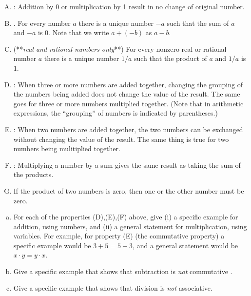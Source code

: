 \begin{enumerate}[(A)]
\item
{}:   Addition by 0 or multiplication by 1 result in no change of original number.
\item
{}. For every number $a$ there is a unique number $-a$ such that the sum of $a$ and $-a$ is 0.   Note that we write $a + (-b)$ as $a-b$.
\item
{} (**\emph{real and rational numbers only}**)   For every nonzero real or rational number $a$ there is a unique number $1/a$ such that the product of $a$ and $1/a$ is 1.  
\item
{}: When three or more numbers are added together, changing the grouping of the numbers being added does not change the value of the result.   The same goes for three or more numbers multiplied together. (Note that in arithmetic expressions, the ``grouping'' of numbers is indicated by parentheses.)
\item
{}: When two numbers are added together, the two numbers can be exchanged without changing the value of the result. The same thing is true for two numbers being mulitiplied together.
\item
{}:   Multiplying a number by a sum gives the same result as taking the sum of the products.
\item {}
If  the product of two numbers is zero, then one or the other number must be zero.
\end {enumerate}


\begin{exercise}{1}
\begin{enumerate}[(a)]
\item
For each of the properties (D),(E),(F)  above, give (i) a specific example for addition, using numbers, and (ii) a general statement for multiplication, using variables.  
For example, for property (E) (the commutative property) a specific example would be  $3+5 = 5+3$, and a general statement would be $x \cdot y=y \cdot x$. 
\item
Give a specific example  that shows that subtraction is \emph{not} commutative 
.\item
Give a specific example  that shows that division is \emph{not} associative. 
\end{enumerate}
\end{exercise}

